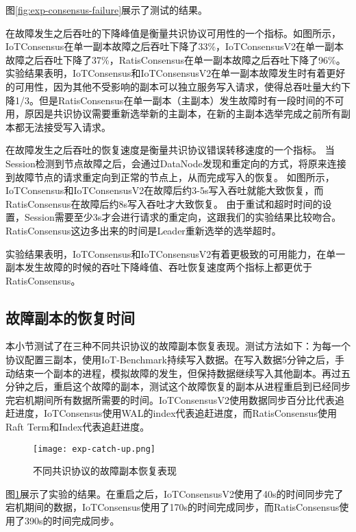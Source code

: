 图\ref{fig:exp-consensus-failure}展示了测试的结果。

在故障发生之后吞吐的下降峰值是衡量共识协议可用性的一个指标。如图所示，IoTConsensus在单一副本故障之后吞吐下降了33\%，IoTConsensusV2在单一副本故障之后吞吐下降了37\%，RatisConsensus在单一副本故障之后吞吐下降了96\%。
实验结果表明，IoTConsensus和IoTConsensusV2在单一副本故障发生时有着更好的可用性，因为其他不受影响的副本可以独立服务写入请求，使得总吞吐量大约下降1/3。但是RatisConsensus在单一副本（主副本）发生故障时有一段时间的不可用，原因是共识协议需要重新选举新的主副本，在新的主副本选举完成之前所有副本都无法接受写入请求。

在故障发生之后吞吐的恢复速度是衡量共识协议错误转移速度的一个指标。
当Session检测到节点故障之后，会通过DataNode发现和重定向的方式，将原来连接到故障节点的请求重定向到正常的节点上，从而完成写入的恢复。
如图所示，IoTConsensus和IoTConsensusV2在故障后约3-5s写入吞吐就能大致恢复，而RatisConsensus在故障后约8s写入吞吐才大致恢复。
由于重试和超时时间的设置，Session需要至少3s才会进行请求的重定向，这跟我们的实验结果比较吻合。RatisConsensus这边多出来的时间是Leader重新选举的选举超时。

实验结果表明，IoTConsensus和IoTConsensusV2有着更极致的可用能力，在单一副本发生故障的时候的吞吐下降峰值、吞吐恢复速度两个指标上都更优于RatisConsensus。



\subsection{故障副本的恢复时间}

本小节测试了在三种不同共识协议的故障副本恢复表现。测试方法如下：为每一个协议配置三副本，使用IoT-Benchmark持续写入数据。在写入数据5分钟之后，手动结束一个副本的进程，模拟故障的发生，但保持数据继续写入其他副本。再过五分钟之后，重启这个故障的副本，测试这个故障恢复的副本从进程重启到已经同步完宕机期间所有数据所需要的时间。IoTConsensusV2使用数据同步百分比代表追赶进度，IoTConsensus使用WAL的index代表追赶进度，而RatisConsensus使用Raft Term和Index代表追赶进度。

\begin{figure}
    \centering
    \texttt{[image: exp-catch-up.png]}
    \caption{不同共识协议的故障副本恢复表现}
    \label{fig:exp-catch-up}
\end{figure}

图\ref{fig:exp-catch-up}展示了实验的结果。在重启之后，IoTConsensusV2使用了40s的时间同步完了宕机期间的数据，IoTConsensus使用了170s的时间完成同步，而RatisConsensus使用了390s的时间完成同步。

